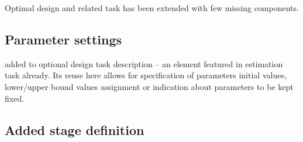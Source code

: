 Optimal design and related task has been extended with few missing components.

\subsection{Parameter settings}
 added to optional design task description -- an element
featured in estimation task already. Its reuse here allows for specification of parameters
initial values, lower/upper bound values assignment or indication about 
parameters to be kept fixed.


\subsection{Added stage definition}

